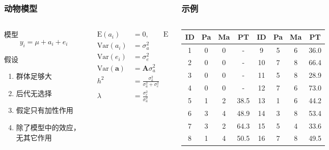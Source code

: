 \documentclass[serif,aspectratio=169]{beamer}
\begin{document}
\begin{frame}
\begin{columns}
\begin{frame}
  \frametitle{动物模型}
  \begin{columns}
    \begin{column}{.5\textwidth}
      \begin{block}{模型}
        $$y_i = \mu+a_i+e_i$$
      \end{block}
      \begin{block}{假设}
        \begin{enumerate}
        \item 群体足够大
        \item 后代无选择
        \item 假定只有加性作用
        \item 除了模型中的效应，无其它作用
        \end{enumerate}
      \end{block}
    \end{column}
    
    \begin{column}{.5\textwidth}
      \begin{align*}
        \mathrm{E}(a_i) &= 0,\qquad \mathrm{E}(e_i)=0\\
        \mathrm{Var}(a_i) &=\sigma_a^2\\
        \mathrm{Var}(e_i) &=\sigma_e^2\\
        \mathrm{Var}(\mathbf{a}) &= \mathbf{A}\sigma_a^2\\
        h^2 &=\frac{\sigma_a^2}{\sigma_a^2+\sigma_e^2}\\
        \lambda &=\frac{\sigma_e^2}{\sigma_a^2}
      \end{align*}
    \end{column}
  \end{columns}
\end{frame}


\begin{frame}
  \frametitle{示例}
  \begin{columns}
    \begin{column}{.8\textwidth}
      \centering
      \begin{tabular}{cccc|cccc}
        ID & Pa & Ma & PT & ID & Pa & Ma & PT \\\hline
        1 & 0 & 0 &  -   &  9 & 5 & 6 & 36.0\\
        2 & 0 & 0 &  -   & 10 & 7 & 8 & 66.4\\
        3 & 0 & 0 &  -   & 11 & 5 & 8 & 28.9\\
        4 & 0 & 0 &  -   & 12 & 7 & 6 & 73.0\\
        5 & 1 & 2 & 38.5 & 13 & 1 & 6 & 44.2\\
        6 & 3 & 4 & 48.9 & 14 & 3 & 8 & 53.4\\
        7 & 3 & 2 & 64.3 & 15 & 5 & 4 & 33.6\\
        8 & 1 & 4 & 50.5 & 16 & 7 & 8 & 49.5 
      \end{tabular}
    \end{column}


\end{columns}
\end{frame}
\end{columns}
\end{frame}
\end{document}
